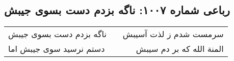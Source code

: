\begin{center}
\section*{رباعی شماره ۱۰۰۷: ناگه بزدم دست بسوی جیبش}
\label{sec:1007}
\begin{longtable}{l p{0.5cm} r}
ناگه بزدم دست بسوی جیبش
&&
سرمست شدم ز لذت آسیبش
\\
دستم نرسید سوی جیبش اما
&&
المنة الله که بر دم سیبش
\\
\end{longtable}
\end{center}
